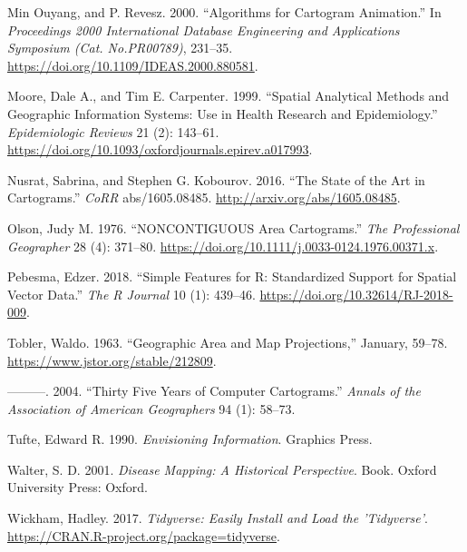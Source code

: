 \documentclass[11pt,]{article}
\begin{document}
\leavevmode\hypertarget{ref-ACA}{}%
Min Ouyang, and P. Revesz. 2000. ``Algorithms for Cartogram Animation.''
In \emph{Proceedings 2000 International Database Engineering and
Applications Symposium (Cat. No.PR00789)}, 231--35.
\url{https://doi.org/10.1109/IDEAS.2000.880581}.

\leavevmode\hypertarget{ref-SAMGIS}{}%
Moore, Dale A., and Tim E. Carpenter. 1999. ``Spatial Analytical Methods
and Geographic Information Systems: Use in Health Research and
Epidemiology.'' \emph{Epidemiologic Reviews} 21 (2): 143--61.
\url{https://doi.org/10.1093/oxfordjournals.epirev.a017993}.

\leavevmode\hypertarget{ref-SAIC}{}%
Nusrat, Sabrina, and Stephen G. Kobourov. 2016. ``The State of the Art
in Cartograms.'' \emph{CoRR} abs/1605.08485.
\url{http://arxiv.org/abs/1605.08485}.

\leavevmode\hypertarget{ref-NAC}{}%
Olson, Judy M. 1976. ``NONCONTIGUOUS Area Cartograms.'' \emph{The
Professional Geographer} 28 (4): 371--80.
\url{https://doi.org/10.1111/j.0033-0124.1976.00371.x}.

\leavevmode\hypertarget{ref-sf}{}%
Pebesma, Edzer. 2018. ``Simple Features for R: Standardized Support for
Spatial Vector Data.'' \emph{The R Journal} 10 (1): 439--46.
\url{https://doi.org/10.32614/RJ-2018-009}.

\leavevmode\hypertarget{ref-GAMP}{}%
Tobler, Waldo. 1963. ``Geographic Area and Map Projections,'' January,
59--78. \url{https://www.jstor.org/stable/212809}.

\leavevmode\hypertarget{ref-TFYCC}{}%
---------. 2004. ``Thirty Five Years of Computer Cartograms.''
\emph{Annals of the Association of American Geographers} 94 (1): 58--73.

\leavevmode\hypertarget{ref-EI}{}%
Tufte, Edward R. 1990. \emph{Envisioning Information}. Graphics Press.

\leavevmode\hypertarget{ref-DMAHP}{}%
Walter, S. D. 2001. \emph{Disease Mapping: A Historical Perspective}.
Book. Oxford University Press: Oxford.

\leavevmode\hypertarget{ref-tidyerse}{}%
Wickham, Hadley. 2017. \emph{Tidyverse: Easily Install and Load the
'Tidyverse'}. \url{https://CRAN.R-project.org/package=tidyverse}.
\end{document}

